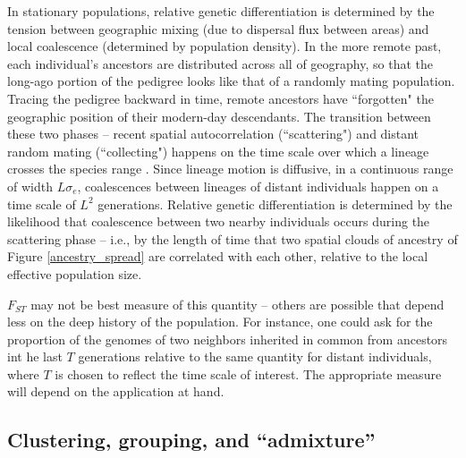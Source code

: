 \documentclass{ar-1col}
\newcommand{\plr}[1]{{\color{green}{#1}}}
\begin{document}
In stationary populations,
relative genetic differentiation is determined by the tension between 
geographic mixing (due to dispersal flux between areas)
and local coalescence (determined by population density).
In the more remote past, each individual's ancestors are distributed across
all of geography,
so that the long-ago portion of the pedigree looks like that of a randomly mating population.
Tracing the pedigree backward in time, 
remote ancestors have ``forgotten" the geographic position of their 
modern-day descendants.
The transition between these two phases -- recent spatial autocorrelation 
(``scattering") and distant random mating (``collecting")
\citep{Wakeley1999,wilkins2004separationoftimescales}
happens on the time scale over which a lineage crosses the species range \citep{Wakeley1999}.
Since lineage motion is diffusive, in a continuous range of width $L \sigma_e$,
coalescences between lineages of distant individuals happen on a time scale of $L^2$ generations.
Relative genetic differentiation
is determined by the likelihood that coalescence between two nearby individuals
occurs during the scattering phase
-- i.e., by the length of time that two spatial clouds of ancestry of Figure \ref{ancestry_spread}
are correlated with each other,
relative to the local effective population size.

$F_{ST}$ may not be best measure of this quantity -- 
others are possible that depend less on the deep history of the population.
For instance,
one could ask for the proportion of the genomes of two neighbors 
inherited in common from ancestors int he last $T$ generations
relative to the same quantity for distant individuals,
where $T$ is chosen to reflect the time scale of interest.
The appropriate measure will depend on the application at hand.

\subsection{Clustering, grouping, and ``admixture''}

\plr{I think there's some redundancy below.}
\end{document}
